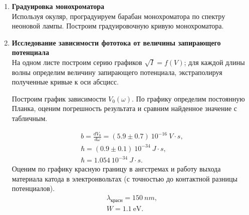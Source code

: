 \begin{enumerate}

\item 
\textbf{Градуировка монохроматора}\\
Используя окуляр, проградуируем барабан монохроматора по спектру неоновой лампы. Построим градуировочную кривую монохроматора.
\begin{figure}[h]
\end{figure}
\item
\textbf{Исследование зависимости фототока от величины запирающего потенциала}\\
На одном листе построим серию графиков $\sqrt{I} = f(V)$; для каждой длины волны определим величину запирающего потенциала, экстраполируя полученные кривые к оси абсцисс.
\begin{figure}[h]
\end{figure}
Построим график зависимости $V_0(\omega)$. По графику определим постоянную Планка, оценим погрешность результата и сравним найденное значение с табличным. 
\begin{figure}[h]
\end{figure}
\begin{gather*}
b = \frac{dV_0}{d\omega} = (5.9 \pm 0.7)~10^{-16}~V \cdot s,\\
\hbar = (0.9 \pm 0.1)~10^{-34}~J \cdot s,\\
\hbar = 1.054 ~10^{-34}~J \cdot s.
\end{gather*}
Оценим по графику красную границу в ангстремах и работу выхода материала катода в электронвольтах (с точностью до контактной разницы потенциалов).
\begin{gather*}
\lambda_{\text{красн}} = 150~nm,\\
W = 1.1~\text{eV}.
\end{gather*}

\clearpage


\begin{figure}
\end{figure}
\begin{figure}
\end{figure}
\begin{figure}
\end{figure}

\begin{figure}[h]
\end{figure}

\end{enumerate}

